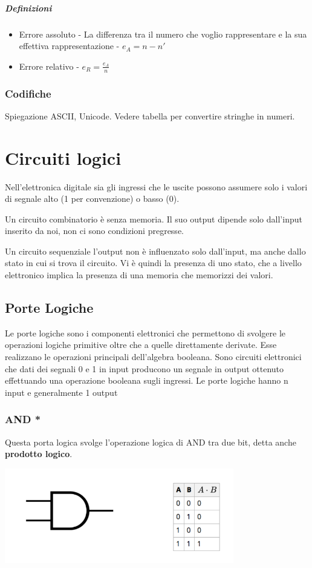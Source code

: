\documentclass[12pt, a4paper, openany]{book}
\begin{document}
\paragraph*{Definizioni}
\begin{itemize}
    \item Errore assoluto - La differenza tra il numero che voglio rappresentare e la sua
    effettiva rappresentazione - $ e_A = n - n'$
    \item Errore relativo - $ e_R = \frac{e_A}{n} $
\end{itemize}

\subsection{Codifiche}
Spiegazione ASCII, Unicode.
Vedere tabella per convertire stringhe in numeri.

\chapter{Circuiti logici}

Nell'elettronica digitale sia gli ingressi che le uscite possono assumere solo i valori 
di segnale alto (1 per convenzione) o basso (0).

Un circuito combinatorio è senza memoria. Il suo output dipende solo dall'input inserito da noi, non ci sono
condizioni pregresse.

Un circuito sequenziale l'output non è influenzato solo dall'input, ma anche dallo stato in cui si trova
il circuito. Vi è quindi la presenza di uno stato, che a livello elettronico implica la presenza di una memoria
che memorizzi dei valori.

\section{Porte Logiche}
Le porte logiche sono i componenti elettronici che permettono di svolgere le operazioni logiche
primitive oltre che a quelle direttamente derivate.
Esse realizzano le operazioni principali dell'algebra booleana. Sono circuiti elettronici che dati dei segnali 0 e 1 in input
producono un segnale in output ottenuto effettuando una operazione booleana sugli ingressi.
Le porte logiche hanno n input e generalmente 1 output

\subsection{AND *}
Questa porta logica svolge l'operazione logica di AND tra due bit, detta anche 
\textbf{prodotto logico}.
\begin{center}
    \includegraphics[width=100mm, scale=0.6]{tabella_and.png}    
\end{center}
\end{document}
